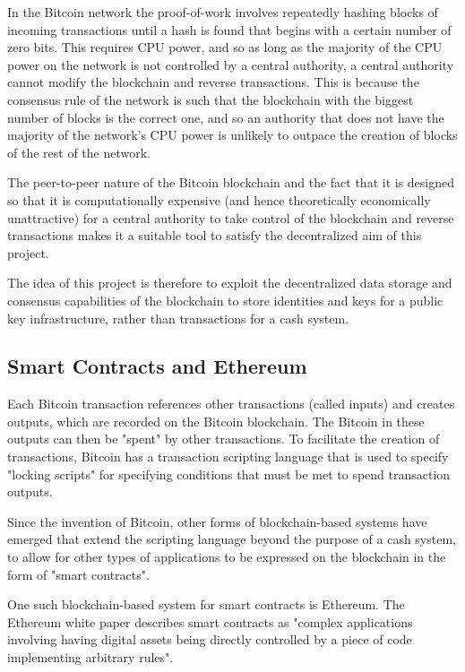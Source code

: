 \documentclass[12pt,a4paper]{report}
\begin{document}
	In the Bitcoin network the proof-of-work involves repeatedly hashing blocks of incoming transactions until a hash is found that begins with a certain number of zero bits. This requires CPU power, and so as long as the majority of the CPU power on the network is not controlled by a central authority, a central authority cannot modify the blockchain and reverse transactions. This is because the consensus rule of the network is such that the blockchain with the biggest number of blocks is the correct one, and so an authority that does not have the majority of the network's CPU power is unlikely to outpace the creation of blocks of the rest of the network.
	
	The peer-to-peer nature of the Bitcoin blockchain and the fact that it is designed so that it is computationally expensive (and hence theoretically economically unattractive) for a central authority to take control of the blockchain and reverse transactions makes it a suitable tool to satisfy the decentralized aim of this project.
	
	The idea of this project is therefore to exploit the decentralized data storage and consensus capabilities of the blockchain to store identities and keys for a public key infrastructure, rather than transactions for a cash system.
	
	\subsection{Smart Contracts and Ethereum}
	Each Bitcoin transaction references other transactions (called inputs) and creates outputs, which are recorded on the Bitcoin blockchain. The Bitcoin in these outputs can then be "spent" by other transactions. To facilitate the creation of transactions, Bitcoin has a transaction scripting language that is used to specify "locking scripts" for specifying conditions that must be met to spend transaction outputs.\cite{10}
	
	Since the invention of Bitcoin, other forms of blockchain-based systems have emerged that extend the scripting language beyond the purpose of a cash system, to allow for other types of applications to be expressed on the blockchain in the form of "smart contracts". 
	
	One such blockchain-based system for smart contracts is Ethereum. The Ethereum white paper describes smart contracts as "complex applications involving having digital assets being directly controlled by a piece of code implementing arbitrary rules".\cite{3}
	
\end{document}
